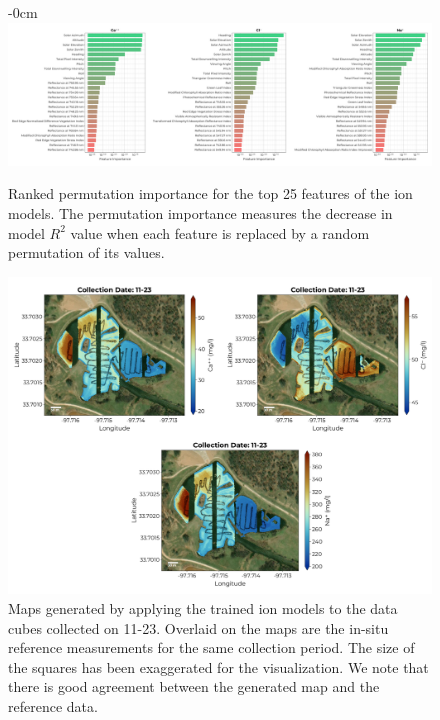 \documentclass[remotesensing,article,submit,pdftex,moreauthors]{Definitions/mdpi}
\begin{document}
\begin{figure}[t!]
\begin{adjustwidth}{-\extralength}{0cm}
\centering
\vspace{-0.1in}
\includegraphics[width=18 cm]{paper/figures/results/fits/ions-ranking.pdf}
\vspace{-0.1in}
\end{adjustwidth}
\caption{Ranked permutation importance for the top 25 features of the ion models. The permutation importance measures the decrease in model $R^2$ value when each feature is replaced by a random permutation of its values.\label{fig:ions-fi}}
\end{figure}  

\begin{figure}[t!]
\centering
\vspace{-0.3in}
\includegraphics[width=\columnwidth]{paper/figures/results/maps/ions.pdf}
\vspace{-0.2in}
\caption{Maps generated by applying the trained ion models to the data cubes collected on 11-23. Overlaid on the maps are the in-situ reference measurements for the same collection period. The size of the squares has been exaggerated for the visualization. We note that there is good agreement between the generated map and the reference data. \label{fig:map-ions}}
\end{figure}  
\end{document}
